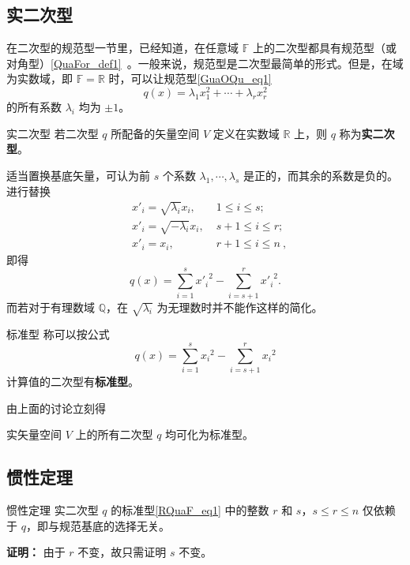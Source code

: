 

\subsection{实二次型}
在二次型的规范型一节里，已经知道，在任意域 $\mathbb F$ 上的二次型都具有规范型（或对角型）\autoref{QuaFor_def1}~。一般来说，规范型是二次型最简单的形式。但是，在域为实数域，即 $\mathbb F=\mathbb R$ 时，可以让规范型\autoref{GuaOQu_eq1}~
\begin{equation}
q({x})=\lambda_1 x_1^2+\cdots+\lambda_r x_r^2
\end{equation}
的所有系数 $\lambda_i$ 均为 $\pm 1$。
\begin{definition}{实二次型}
若二次型 $q$ 所配备的矢量空间 $V$ 定义在实数域 $\mathbb R$ 上，则 $q$ 称为\textbf{实二次型}。
\end{definition}
适当置换基底矢量，可认为前 $s$ 个系数 $\lambda_1,\cdots,\lambda_s$ 是正的，而其余的系数是负的。进行替换
\begin{equation}
\begin{aligned}
&x'_i=\sqrt{\lambda_i}x_i,\;&1\leq i\leq s;\\
&x'_i=\sqrt{-\lambda_i}x_i,\;&s+1\leq i\leq r;\\
&x'_i=x_i,\; &r+1\leq i\leq n~,
\end{aligned}
\end{equation}
 即得
 \begin{equation}
 q({x})=\sum_{i=1}^{s}{x'_i}^2-\sum_{i=s+1}^{r} {x'_{i}}^{2}.
 \end{equation}
 而若对于有理数域 $\mathbb Q$，在 $\sqrt{\lambda_i}$ 为无理数时并不能作这样的简化。
 
\begin{definition}{标准型}
称可以按公式
\begin{equation}\label{RQuaF_eq1}
q( x)=\sum_{i=1}^{s}{x_i}^2-\sum_{i=s+1}^{r} {x_{i}}^{2}
\end{equation}
计算值的二次型有\textbf{标准型}。
\end{definition}
由上面的讨论立刻得
\begin{theorem}{}\label{RQuaF_the1}
实矢量空间 $V$ 上的所有二次型 $q$ 均可化为标准型。
\end{theorem}
\subsection{惯性定理}
\begin{theorem}{惯性定理}
实二次型 $q$ 的标准型\autoref{RQuaF_eq1} 中的整数 $r$ 和 $s$，$s\leq r\leq n$ 仅依赖于 $q$，即与规范基底的选择无关。
\end{theorem}
\textbf{证明：} 由于 $r$ 不变，故只需证明 $s$ 不变。

